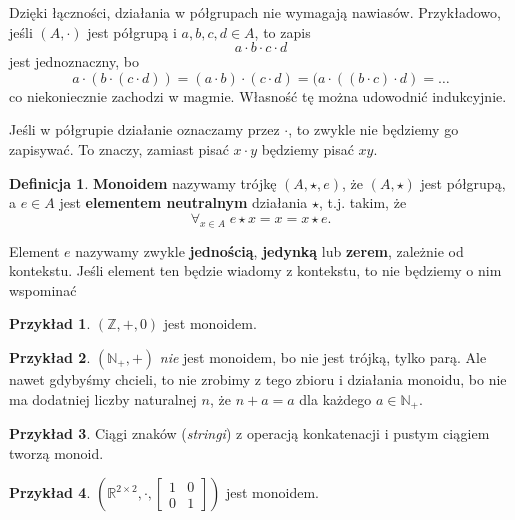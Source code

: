 \documentclass{book}
\theoremstyle{definition}
\newtheorem{definition}{Definicja}[section]
\newtheorem{example}{Przykład}[section]
\begin{document}
Dzięki łączności,
	działania w półgrupach nie wymagają nawiasów.
Przykładowo, jeśli $(A, \cdot)$ jest półgrupą i $a, b, c, d \in A$,
	to zapis
\begin{equation}
	a \cdot b \cdot c \cdot d
\end{equation}
	jest jednoznaczny, bo
\begin{equation}
		a \cdot (b \cdot (c \cdot d)) = 
		(a \cdot b) \cdot (c \cdot d) =
		(a \cdot ((b \cdot c) \cdot d) = \dots
\end{equation}
	co niekoniecznie zachodzi w magmie.
Własność tę można udowodnić indukcyjnie.

Jeśli w półgrupie działanie oznaczamy przez $\cdot$,
	to zwykle nie będziemy go zapisywać.
To znaczy, zamiast pisać $x \cdot y$ będziemy pisać $xy$.

\begin{definition}
	\textbf{Monoidem} nazywamy trójkę $(A, \star, e)$,
		że $(A, \star)$ jest półgrupą,
		a $e\in A$ jest \textbf{elementem neutralnym} działania $\star$,
		t.j. takim, że
	\begin{equation}
		\forall_{x \in A}\; e \star x = x = x \star e.
	\end{equation}
\end{definition}

Element $e$ nazywamy zwykle \textbf{jednością},
	\textbf{jedynką} lub \textbf{zerem},
	zależnie od kontekstu.
Jeśli element ten będzie wiadomy z kontekstu,
	to nie będziemy o nim wspominać

\begin{example}
	$(\mathbb{Z}, +, 0)$ jest monoidem.
\end{example}

\begin{example}
	$(\mathbb{N}_+, +)$ \textit{nie} jest monoidem, bo nie jest trójką, tylko parą.
	Ale nawet gdybyśmy chcieli,
		to nie zrobimy z tego zbioru i działania monoidu,
		bo nie ma dodatniej liczby naturalnej $n$,
		że $n + a = a$ dla każdego $a \in \mathbb{N}_+$.
\end{example}

\begin{example}
	Ciągi znaków (\textit{stringi}) z operacją konkatenacji i pustym ciągiem tworzą monoid.
\end{example}

\begin{example}
	$\left(\mathbb{R}^{2 \times 2}, \cdot, \left[\begin{matrix} 1 & 0 \\ 0 & 1 \end{matrix}\right]\right)$ jest monoidem.
\end{example}
\end{document}
